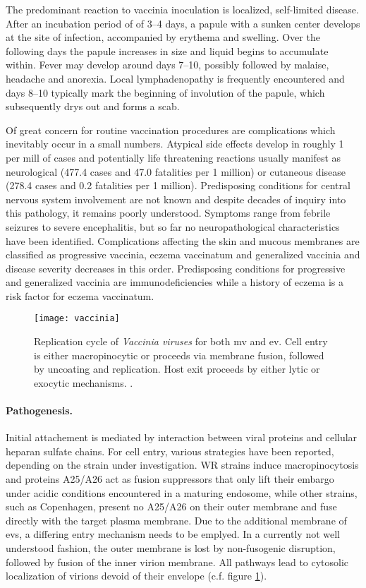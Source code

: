 The predominant reaction to vaccinia inoculation is localized, self-limited disease. After an incubation period of of 3--4 days, a papule with a sunken center develops at the site of infection, accompanied by erythema and swelling. Over the following days the papule increases in size and liquid begins to accumulate within. Fever may develop around days 7--10, possibly followed by malaise, headache and anorexia. Local lymphadenopathy is frequently encountered and days 8--10 typically mark the beginning of involution of the papule, which subsequently drys out and forms a scab.

Of great concern for routine vaccination procedures are complications which inevitably occur in a small numbers. Atypical side effects develop in roughly 1 per mill of cases and potentially life threatening reactions usually manifest as neurological (477.4 cases and 47.0 fatalities per 1 million) or cutaneous disease (278.4 cases and 0.2 fatalities per 1 million). Predisposing conditions for central nervous system involvement are not known and despite decades of inquiry into this pathology, it remains poorly understood. Symptoms range from febrile seizures to severe encephalitis, but so far no  neuropathological characteristics have been identified. Complications affecting the skin and mucous membranes are classified as progressive vaccinia, eczema vaccinatum and generalized vaccinia and disease severity decreases in this order. Predisposing conditions for progressive and generalized vaccinia are immunodeficiencies while a history of eczema is a risk factor for eczema vaccinatum.

\begin{figure}[t]
  \centering
  \texttt{[image: vaccinia]}
  \caption[Replication cycle of \textit{Vaccinia viruses} for both intracellular mature and extracellular enveloped virions.]{Replication cycle of \textit{Vaccinia viruses} for both \acrfull{mv} and \acrfull{ev}. Cell entry is either macropinocytic or proceeds via membrane fusion, followed by uncoating and replication. Host exit proceeds by either lytic or exocytic mechanisms. \citep{Hulo2011}.}
  \label{fig:vaccinia}
\end{figure}

\paragraph{Pathogenesis.}
Initial attachement is mediated by interaction between viral proteins and cellular heparan sulfate chains. For cell entry, various strategies have been reported, depending on the strain under investigation. WR strains induce macropinocytosis and proteins A25/A26 act as fusion suppressors that only lift their embargo under acidic conditions encountered in a maturing endosome, while other strains, such as Copenhagen, present no A25/A26 on their outer membrane and fuse directly with the target plasma membrane. Due to the additional membrane of \glspl{ev}, a differing entry mechanism needs to be emplyed. In a currently not well understood fashion, the outer membrane is lost by non-fusogenic disruption, followed by fusion of the inner virion membrane. All pathways lead to cytosolic localization of virions devoid of their envelope (c.f. figure \ref{fig:vaccinia}).

